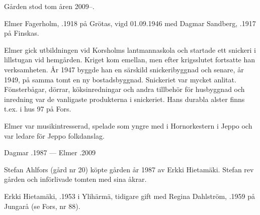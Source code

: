 %
Gården stod tom åren 2009--.\jhvspace{}


%
Elmer Fagerholm, .1918 på Grötas, vigd 01.09.1946 med Dagmar Sandberg, .1917 på Finskas.
\begin{jhchildren}
  \item {}
  \item {}
\end{jhchildren}

Elmer gick utbildningen vid Korsholms lantmannaskola och startade ett snickeri i lillstugan vid hemgården. Kriget kom emellan, men efter krigsslutet fortsatte han verksamheten. År 1947 byggde han en särskild snickeribyggnad och senare, år 1949, på samma tomt en ny bostadsbyggnad. Snickeriet var mycket anlitat. Fönsterbågar, dörrar, köksinredningar och andra tillbehör för husbyggnad och inredning var de vanligaste produkterna i snickeriet. Hans durabla alster finns t.ex. i hus 97 på Fors.

Elmer var musikintresserad, spelade som yngre med i Hornorkestern i Jeppo och var ledare för Jeppo folkdanslag.

Dagmar .1987  ---  Elmer .2009



%



%
Stefan Ahlfors (gård nr 20) köpte gården år 1987 av Erkki Hietamäki. Stefan rev gården och införlivade tomten med sina åkrar.\jhvspace{}


%
Erkki Hietamäki, .1953 i Ylihärmä, tidigare gift med Regina Dahlström, .1959  på Jungarå (se Fors, nr 88).
\begin{jhchildren}
  \item {}
  \item {}
\end{jhchildren}

